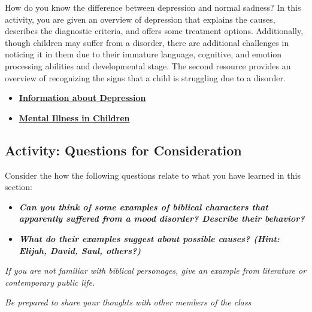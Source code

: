 \documentclass[
]{book}
\providecommand{\tightlist}{%
  \setlength{\itemsep}{0pt}\setlength{\parskip}{0pt}}
\begin{document}
\begin{reflect}
How do you know the difference between depression and normal sadness? In this activity, you are given an overview of depression that explains the causes, describes the diagnostic criteria, and offers some treatment options. Additionally, though children may suffer from a disorder, there are additional challenges in noticing it in them due to their immature language, cognitive, and emotion processing abilities and developmental stage. The second resource provides an overview of recognizing the signs that a child is struggling due to a disorder.

\begin{itemize}
\tightlist
\item
  \href{https://psychologyinfo.com/}{\textbf{Information about Depression}}\\
\item
  \href{https://www.mayoclinic.org/healthy-lifestyle/childrens-health/in-depth/mental-illness-in-children/art-20046577}{\textbf{Mental Illness in Children}}
\end{itemize}
\end{reflect}

\hypertarget{activity-questions-for-consideration-18}{%
\subsection*{Activity: Questions for Consideration}\label{activity-questions-for-consideration-18}}

\begin{reflect}
Consider the how the following questions relate to what you have learned in this section:

\begin{itemize}
\tightlist
\item
  \textbf{\emph{Can you think of some examples of biblical characters that apparently suffered from a mood disorder? Describe their behavior?}}\\
\item
  \textbf{\emph{What do their examples suggest about possible causes? (Hint: Elijah, David, Saul, others?)}}
\end{itemize}

\emph{If you are not familiar with biblical personages, give an example from literature or contemporary public life.}

\emph{Be prepared to share your thoughts with other members of the class}
\end{reflect}
\end{document}
